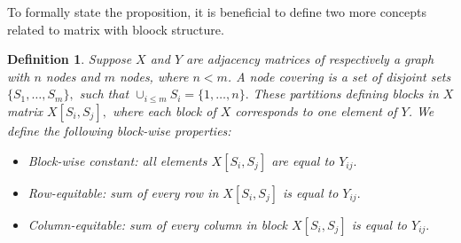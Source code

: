 \documentclass{article}
\newtheorem{definition}{Definition}[section]
\begin{document}
To formally state the proposition, it is beneficial to define two more concepts related to matrix with bloock structure. 
\begin{definition}
    Suppose $X$ and $Y$ are adjacency matrices of respectively a graph with $n$ nodes and $m$ nodes, where $n < m$. A node covering is a set of disjoint sets  $\{S_1,\dots,S_m\},$ such that $\cup_{i\le m} S_i = \{1,\dots,n\}. $ These partitions defining blocks in $X$ matrix $X[S_i,S_j],$ where each block of $X$ corresponds to one element of $Y$.  We define the following block-wise properties: 
    \begin{itemize}
        \item Block-wise constant: all elements $X[S_i,S_j]$ are equal to $Y_{ij}.$
        \item Row-equitable: sum of every row in $X[S_i,S_j]$ is equal to $Y_{ij}.$
        \item Column-equitable: sum of every column in block $X[S_i,S_j]$ is equal to $Y_{ij}.$
    \end{itemize}
\end{definition}
\end{document}
